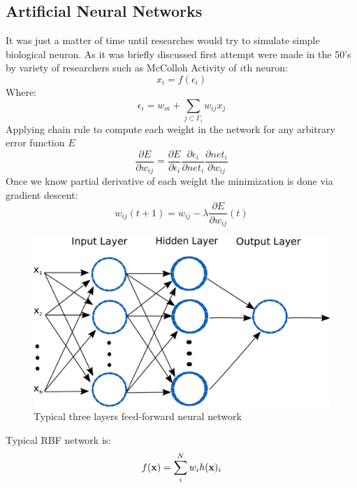 \subsection{Artificial Neural Networks}
It was just a matter of time until researches would try to simulate simple biological neuron. As it was briefly discussed first attempt were made in the 50's by variety of researchers such as McColloh 
Activity of $i$th neuron:
\begin{equation}\label{eq:n1}
x_i=f(\epsilon_{i})
\end{equation}
Where: 
\begin{equation}\label{eq:n2}
\epsilon_{i}=w_{oi}+\sum_{j\subset\Gamma_i}w_{ij}x_j
\end{equation}
Applying chain rule to compute each weight in the network for any arbitrary error function $E$
\begin{equation}\label{eq:n3}
\frac{\partial E}{\partial w_{ij}}=\frac{\partial E}{\partial \epsilon_{i}}\frac{\partial \epsilon_{i}}{\partial net_{i}}\frac{\partial net_i}{\partial w_{ij}}
\end{equation}
Once we know partial derivative of each weight the minimization is done via gradient descent:
\begin{equation}\label{eq:n4}
w_{ij}(t+1)=w_{ij}-\lambda\frac{\partial E}{\partial w_{ij}}(t)
\end{equation}
\begin{figure}[h!]
\centering
\includegraphics[width=1\textwidth]{figures/chap3/mlp.png}
\caption{Typical three layers feed-forward neural network}
\label{figure:mlp}
\end{figure}
Typical RBF network is: 
\begin{equation}\label{eq:rbf1}
f(\bold x)=\sum_{i}^Nw_ih(\bold x)_i
\end{equation}
